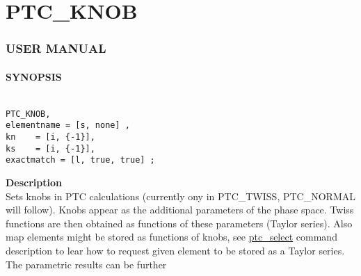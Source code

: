


\section{PTC\_KNOB}





\subsubsection{   USER MANUAL   }


\paragraph{SYNOPSIS}
\begin{verbatim}

PTC_KNOB, 
elementname = [s, none] , 
kn    = [i, {-1}], 
ks    = [i, {-1}], 
exactmatch = [l, true, true] ; 

\end{verbatim}


\textbf{ Description }\\

 Sets knobs in PTC calculations (currently ony in PTC\_TWISS, PTC\_NORMAL will follow). Knobs appear as the additional parameters of the phase space. Twiss functions are then obtained  as functions of these parameters (Taylor series).  Also map elements might be stored as functions of knobs, see  \href{PTC_Select.html}{ ptc\_select} command description to lear how to request given element to be stored as a Taylor series.  The parametric results can be further  \\
 
